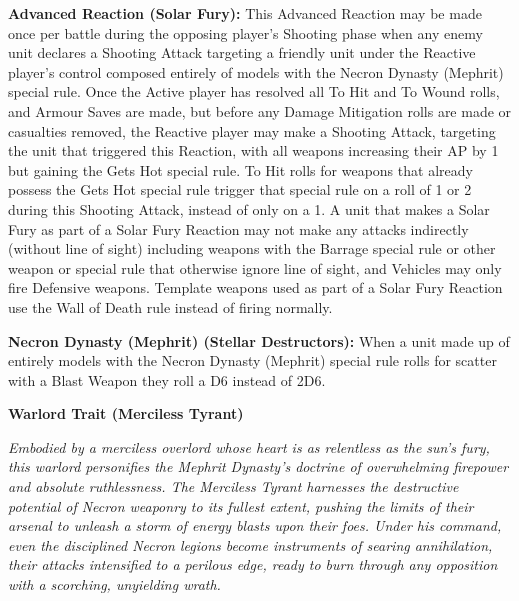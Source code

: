 \begin{multicols}{2}
\textbf{Advanced Reaction (Solar Fury):} This Advanced Reaction may be made once per battle during the opposing player’s Shooting phase when any enemy unit declares a Shooting Attack targeting a friendly unit under the Reactive player’s control composed entirely of models with the Necron Dynasty (Mephrit) special rule. Once the Active player has resolved all To Hit and To Wound rolls, and Armour Saves are made, but before any Damage Mitigation rolls are made or casualties removed, the Reactive player may make a Shooting Attack, targeting the unit that triggered this Reaction, with all weapons increasing their AP by 1 but gaining the Gets Hot special rule. To Hit rolls for weapons that already possess the Gets Hot special rule trigger that special rule on a roll of 1 or 2 during this Shooting Attack, instead of only on a 1. A unit that makes a Solar Fury as part of a Solar Fury Reaction may not make any attacks indirectly (without line of sight) including weapons with the Barrage special rule or other weapon or special rule that otherwise ignore line of sight, and Vehicles may only fire Defensive weapons. Template weapons used as part of a Solar Fury Reaction use the Wall of Death rule instead of firing normally.

\textbf{Necron Dynasty (Mephrit) (Stellar Destructors):}  When a unit made up of entirely models with the Necron Dynasty (Mephrit) special rule rolls for scatter with a Blast Weapon they roll a D6 instead of 2D6.

\textbf{Warlord Trait (Merciless Tyrant)}

\textit{Embodied by a merciless overlord whose heart is as relentless as the sun's fury, this warlord personifies the Mephrit Dynasty’s doctrine of overwhelming firepower and absolute ruthlessness. The Merciless Tyrant harnesses the destructive potential of Necron weaponry to its fullest extent, pushing the limits of their arsenal to unleash a storm of energy blasts upon their foes. Under his command, even the disciplined Necron legions become instruments of searing annihilation, their attacks intensified to a perilous edge, ready to burn through any opposition with a scorching, unyielding wrath.}


\end{multicols}
